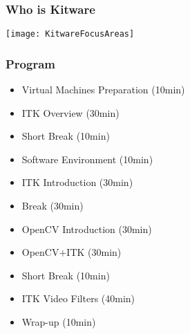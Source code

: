 \documentclass[handout,18pt]{beamer}
\begin{document}
\begin{frame}
\frametitle{Who is Kitware}
\begin{center}
\texttt{[image: KitwareFocusAreas]}
\end{center}
\end{frame}

\begin{frame}
\frametitle{Program}
\begin{itemize}
\item Virtual Machines Preparation (10min)
\pause
\item ITK Overview (30min)
\pause
\item Short Break (10min)
\pause
\item Software Environment (10min)
\pause
\item ITK Introduction (30min)
\pause
\item Break (30min)
\pause
\item OpenCV Introduction (30min)
\pause
\item OpenCV+ITK (30min)
\pause
\item Short Break (10min)
\pause
\item ITK Video Filters (40min)
\pause
\item Wrap-up (10min)
\end{itemize}
\end{frame}















\end{document}
